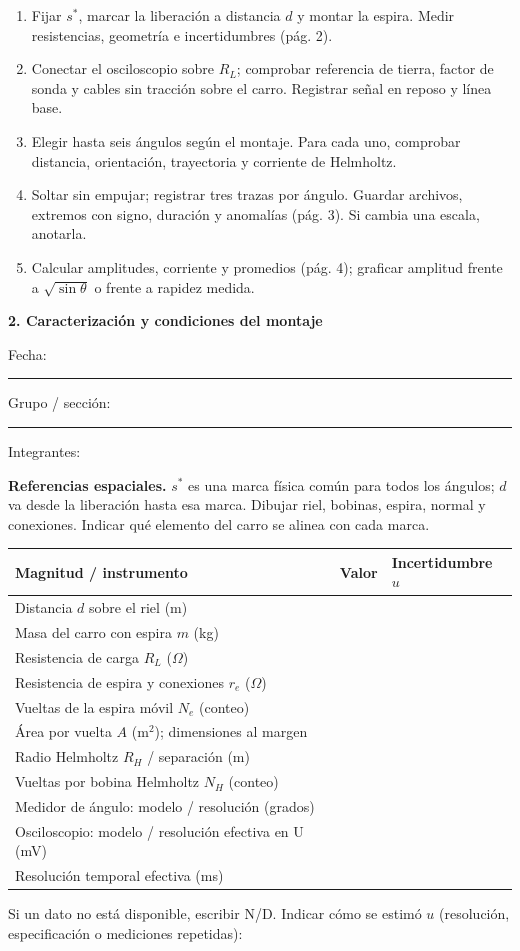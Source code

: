 \documentclass[11pt,letterpaper]{article}
\newcommand{\titulo}[1]{{\Large\bfseries #1}\par\vspace{4pt}}
\newcommand{\subtitulo}[1]{\vspace{5pt}{\bfseries #1}\par}
\newcommand{\campo}{\rule{2.3cm}{0.3pt}}
\begin{document}
\subtitulo{Secuencia de medición}
\begin{enumerate}
\item Fijar $s^*$, marcar la liberación a distancia $d$ y montar la espira. Medir resistencias, geometría e incertidumbres (pág. 2).
\item Conectar el osciloscopio sobre $R_L$; comprobar referencia de tierra, factor de sonda y cables sin tracción sobre el carro. Registrar señal en reposo y línea base.
\item Elegir hasta seis ángulos según el montaje. Para cada uno, comprobar distancia, orientación, trayectoria y corriente de Helmholtz.
\item Soltar sin empujar; registrar tres trazas por ángulo. Guardar archivos, extremos con signo, duración y anomalías (pág. 3). Si cambia una escala, anotarla.
\item Calcular amplitudes, corriente y promedios (pág. 4); graficar amplitud frente a $\sqrt{\sin\theta}$ o frente a rapidez medida.
\end{enumerate}

\newpage
\small
\titulo{2. Caracterización y condiciones del montaje}
Fecha: \campo\quad Grupo / sección: \campo

Integrantes: \hrulefill

\textbf{Referencias espaciales.} $s^*$ es una marca física común para todos los ángulos; $d$ va desde la liberación hasta esa marca. Dibujar riel, bobinas, espira, normal y conexiones. Indicar qué elemento del carro se alinea con cada marca.


\subtitulo{Magnitudes fijas e instrumentos}
\small
\renewcommand{\arraystretch}{1.12}
\begin{tabularx}{\linewidth}{|p{9.0cm}|Y|Y|}\hline
\textbf{Magnitud / instrumento} & \textbf{Valor} & \textbf{Incertidumbre $u$} \\\hline
Distancia $d$ sobre el riel (m) & & \\\hline
Masa del carro con espira $m$ (kg) & & \\\hline
Resistencia de carga $R_L$ ($\Omega$) & & \\\hline
Resistencia de espira y conexiones $r_e$ ($\Omega$) & & \\\hline
Vueltas de la espira móvil $N_e$ (conteo) & & \\\hline
Área por vuelta $A$ (m$^2$); dimensiones al margen & & \\\hline
Radio Helmholtz $R_H$ / separación (m) & & \\\hline
Vueltas por bobina Helmholtz $N_H$ (conteo) & & \\\hline
Medidor de ángulo: modelo / resolución (grados) & & \\\hline
Osciloscopio: modelo / resolución efectiva en U (mV) & & \\\hline
Resolución temporal efectiva (ms) & & \\\hline
\end{tabularx}
\small Si un dato no está disponible, escribir N/D. Indicar cómo se estimó $u$ (resolución, especificación o mediciones repetidas): \hrulefill
\end{document}

